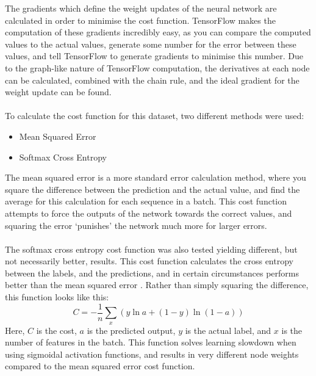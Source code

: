 \documentclass[a4paper,11pt,notitlepage]{article}
\begin{document}
The gradients which define the weight updates of the neural network are calculated in order to minimise the cost function. TensorFlow makes the computation of these gradients incredibly easy, as you can compare the computed values to the actual values, generate some number for the error between these values, and tell TensorFlow to generate gradients to minimise this number. Due to the graph-like nature of TensorFlow computation, the derivatives at each node can be calculated, combined with the chain rule, and the ideal gradient for the weight update can be found.\\
\\
To calculate the cost function for this dataset, two different methods were used:
\begin{itemize}
\item Mean Squared Error
\item Softmax Cross Entropy
\end{itemize}
The mean squared error is a more standard error calculation method, where you square the difference between the prediction and the actual value, and find the average for this calculation for each sequence in a batch. This cost function attempts to force the outputs of the network towards the correct values, and squaring the error `punishes' the network much more for larger errors.\\
\\
The softmax cross entropy cost function was also tested yielding different, but not necessarily better, results. This cost function calculates the cross entropy between the labels, and the predictions, and in certain circumstances performs better than the mean squared error \cite{dunne1997pairing}. Rather than simply squaring the difference, this function looks like this:
\begin{equation}
C = -\frac{1}{n}\sum_{x}(y\ln a+(1-y)\ln(1-a))
\end{equation}
Here, $C$ is the cost, $a$ is the predicted output, $y$ is the actual label, and $x$ is the number of features in the batch. This function solves learning slowdown when using sigmoidal activation functions, and results in very different node weights compared to the mean squared error cost function.\\
\end{document}
